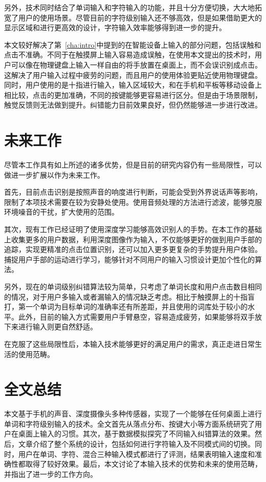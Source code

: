 另外，技术同时结合了单词输入和字符输入的功能，并且十分方便切换，大大地拓宽了用户的使用场景。尽管目前的字符级别输入还不够高效，但是如果借助更大的显示区域和进行更高效的设计，字符输入效率能够得到进一步的提升。

本文较好解决了第~\ref{cha:intro}中提到的在智能设备上输入的部分问题，包括误触和点击不准确。不同于在触摸屏上输入容易造成误触，在使用本文提出的技术时，用户可以像在物理键盘上输入一样自由的将手放置在桌面上，而不会误识别成点击。这解决了用户输入过程中疲劳的问题，而且用户的使用体验更贴近使用物理键盘。同时，用户使用的是十指进行输入，输入区域较大，和在手机和平板等移动设备上相比较，点击的更加准确，不同的按键能够更容易进行区分。但是由于场景限制，触觉反馈则无法做到提升。纠错能力目前效果良好，但仍然能够进一步进行改进。


\section{未来工作}
尽管本工作具有如上所述的诸多优势，但是目前的研究内容仍有一些局限性，可以做进一步扩展以作为未来工作。

首先，目前点击识别是按照声音的响度进行判断，可能会受到外界说话声等影响，限制了本项技术需要在较为安静处使用。使用音频处理的方法进行滤波，能够克服环境噪音的干扰，扩大使用的范围。

其次，现有工作已经证明了使用深度学习能够高效识别人的手势\cite{MolchanovGKK15}。在本工作的基础上收集更多的用户数据，利用深度图像作为输入，不仅能够更好的做到用户手部的追踪，实现更精准的点击位置识别，还可以加入更多更复杂的手势提升用户体验。捕捉用户手部的运动进行学习，能够针对不同用户的输入习惯设计更加个性化的算法。

另外，现在的单词级别纠错算法较为简单，只考虑了单词长度和用户点击数目相同的情况，对于用户多输入或者漏输入的情况缺乏考虑。相比于触摸屏上的十指盲打，第一个单词为目标单词的准确率还有所差距，并且使用的词库处于较小的水平。此外，目前的输入方式需要用户手臂悬空，容易造成疲劳，如果能够将双手放下来进行输入则更自然舒适。

在克服了这些局限性后，本输入技术能够更好的满足用户的需求，真正走进日常生活的使用范畴。

\section{全文总结}
本文基于手机的声音、深度摄像头多种传感器，实现了一个能够在任何桌面上进行单词和字符级别输入的技术。全文首先从落点分布、按键大小等方面系统研究了用户在桌面上输入的习惯。其次，基于数据模拟探究了不同输入纠错算法的效果。然后，文章介绍了整个系统的设计，包括如何进行字符输入及不同模式间的切换。同时，用户在单词、字符、混合三种输入模式都进行了评测，结果表明输入速度和准确性都取得了较好效果。最后，本文讨论了本输入技术的优势和未来的使用范畴，并指出了进一步的工作方向。